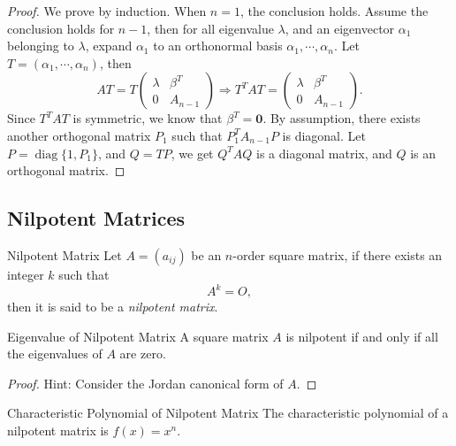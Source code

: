 \begin{proof}
  We prove by induction.
  When $n = 1$, the conclusion holds.
  Assume the conclusion holds for $n - 1$,
  then for all eigenvalue $\lambda$, and an eigenvector $\alpha_1$ belonging to
  $\lambda$, expand $\alpha_1$ to an orthonormal basis
  $\alpha_1,\cdots,\alpha_n$.
  Let $T = (\alpha_1,\cdots,\alpha_n)$, then
  \begin{equation}
    AT = T \left(
      \begin{array}{cc}
        \lambda&\beta^T\\
        0&A_{n-1}
      \end{array}
    \right) \Rightarrow T^T AT = \left(
      \begin{array}{cc}
        \lambda&\beta^T \\
               0&A_{n-1}
      \end{array}
    \right).
  \end{equation}
  Since $T^TAT$ is symmetric, we know that $\beta^T = \mathbf{0}$.
  By assumption, there exists another orthogonal matrix $P_1$ such that
  $P_1^TA_{n-1}P$ is diagonal. Let $P = \operatorname{diag}\{1, P_1\}$,
  and $Q = TP$, we get $Q^TAQ$ is a diagonal matrix, and $Q$ is an orthogonal matrix.
\end{proof}

\subsection{Nilpotent Matrices}

\begin{definition}{Nilpotent Matrix}{}
  Let $A = (a_{ij})$ be an $n$-order square matrix, if
  there exists an integer $k$ such that
  \begin{equation}
    A^k = O,
  \end{equation}
  then it is said to be a \emph{nilpotent matrix}.
\end{definition}

\begin{proposition}{Eigenvalue of Nilpotent Matrix}{}
  A square matrix $A$ is nilpotent if and only if all the eigenvalues of $A$ are
  zero.
\end{proposition}

\begin{proof}
  Hint: Consider the Jordan canonical form of $A$.
\end{proof}

\begin{corollary}{Characteristic Polynomial of Nilpotent Matrix}{}
  The characteristic polynomial of a nilpotent matrix is $f(x) = x^n$.
\end{corollary}

